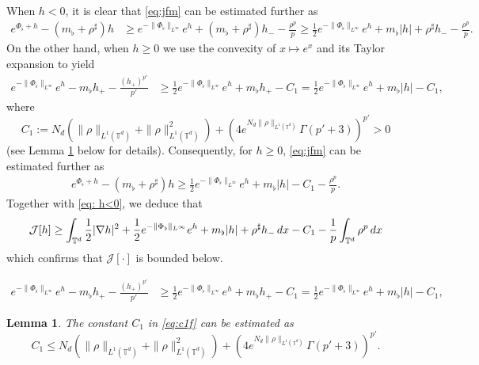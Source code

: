 \documentclass[10pt,a4paper]{amsart}
\newtheorem{lemma}{Lemma}
\newcommand{\T} {\mathbb T}
\newcommand{\bq}{\begin{equation}}
\newcommand{\calJ}{\mathcal J}
\newcommand{\dx}{\textnormal{d}x}
\newcommand{\eq}{\end{equation}}
\newcommand{\intt}{\int_{\T^d}}
\newcommand{\lt}{\left}
\newcommand{\rt}{\right}
\begin{document}
When $h<0$, it is clear that \eqref{eq:jfm} can be estimated further as
\begin{equation}
\label{eq: h<0}
\begin{split}
    e^{\Phi_\flat + h} - \lt(m_\flat + \rho^\sharp \rt)h & \ge e^{-\|\Phi_\flat\|_{L^\infty}}e^h + \lt(m_\flat + \rho^\sharp\rt) h_- - \frac{\rho^p}{p}  \ge \frac{1}{2}e^{-\|\Phi_\flat\|_{L^\infty}}e^h + m_\flat |h| + \rho^\sharp h_- - \frac{\rho^p}{p}.
    \end{split}
\end{equation}
On the other hand, when $h\ge 0$ we use the convexity of $x \mapsto e^x$ and its Taylor expansion to yield
\begin{equation}\label{eq:c1}
\begin{split}
e^{-\|\Phi_\flat\|_{L^\infty}}e^{h}-m_\flat h_+ - \frac{(h_+)^{p'}}{p'} &\ge  \frac{1}{2}e^{-\|\Phi_\flat\|_{L^\infty}}e^{h} + m_\flat h_+ -C_1 = \frac{1}{2}e^{-\|\Phi_\flat\|_{L^\infty}}e^h + m_\flat |h| - C_1,
\end{split}
\end{equation}
where 
\bq\label{eq:c1f}
C_1:= N_d(\|\rho\|_{L^1(\T^d)} + \|\rho\|_{L^1(\T^d)}^2 ) + (4e^{N_d\|\rho\|_{L^1(\T^d)}} \Gamma(p'+3))^{p'} >0
\eq
(see Lemma \ref{lem:C1} below for details). Consequently, for $h\ge 0$, \eqref{eq:jfm} can be estimated further as
\begin{align*}
    e^{\Phi_\flat+h} - \lt(m_\flat + \rho^\sharp \rt)h \ge \frac{1}{2}e^{-\|\Phi_\flat\|_{L^\infty}} e^h + m_\flat |h| - C_1 - \frac{\rho^p}{p}.
\end{align*}
Together with \eqref{eq: h<0}, we deduce that
\bq\label{eq:jlb}
\calJ[h] \ge \intt \frac{1}{2}|\nabla h|^2 + \frac{1}{2}e^{-\|\Phi_\flat\|_{L^\infty}}e^{h} +m_\flat |h| + \rho^\sharp h_-\,\dx -C_1 - \frac{1}{p}\intt \rho^p \,\dx
\eq
which confirms that $\calJ[\cdot]$ is bounded below.

\begin{equation}
\begin{split}
e^{-\|\Phi_\flat\|_{L^\infty}}e^{h}-m_\flat h_+ - \frac{(h_+)^{p'}}{p'} &\ge  \frac{1}{2}e^{-\|\Phi_\flat\|_{L^\infty}}e^{h} + m_\flat h_+ -C_1 = \frac{1}{2}e^{-\|\Phi_\flat\|_{L^\infty}}e^h + m_\flat |h| - C_1,
\end{split}
\end{equation}

\begin{lemma}\label{lem:C1}
The constant $C_1$ in \eqref{eq:c1f} can be estimated as
\[
C_1 \le N_d(\|\rho\|_{L^1(\T^d)} + \|\rho\|_{L^1(\T^d)}^2 ) + (4e^{N_d\|\rho\|_{L^1(\T^d)}} \Gamma(p'+3))^{p'}.
\]
\end{lemma}
\end{document}
